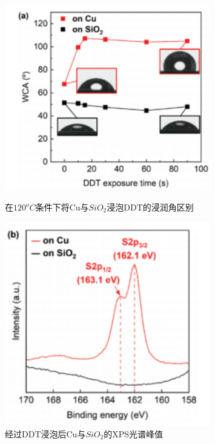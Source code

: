 \documentclass[UTF8,a4paper,12pt]{ctexart}%
\begin{document}
\begin{figure}[htb]
	\centering
	\begin{minipage}[t]{0.5\textwidth}
	\centering
	\includegraphics[width=0.8\textwidth]{8.jpg}
	\caption{在$120^oC$条件下将Cu与$SiO_2$浸泡DDT的浸润角区别}
	\label{Fig:8}
	\end{minipage}
	\begin{minipage}[t]{0.45\textwidth}
	\centering
	\includegraphics[width=0.8\textwidth]{9.jpg}
	\caption{经过DDT浸泡后Cu与$SiO_2$的XPS光谱峰值}
	\label{Fig:9}
	\end{minipage}
\end{figure}
\end{document}
